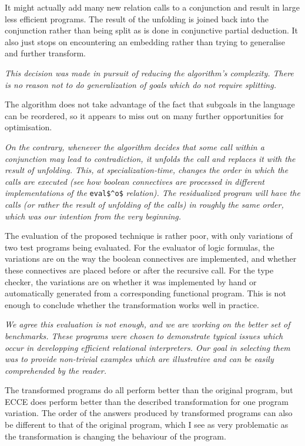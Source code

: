 It might actually add many new relation calls to a conjunction and result in large less efficient programs. The result of the unfolding is joined back into the conjunction rather than being split as is done in conjunctive partial deduction. It also just stops on encountering an embedding rather than trying to generalise and further transform.

\emph{This decision was made in pursuit of reducing the algorithm's complexity. There is no reason not to do generalization of goals which do not require splitting.}

The algorithm does not take advantage of the fact that subgoals in the language can be reordered, so it appears to miss out on many further opportunities for optimisation.

\emph{On the contrary, whenever the algorithm decides that some call within a conjunction may lead to contradiction, it unfolds the call and replaces it with the result of unfolding. This, at specialization-time, changes the order in which the calls are executed (see how boolean connectives are processed in different implementations of the} \lstinline{eval$^o$} \emph{relation). The residualized program will have the calls (or rather the result of unfolding of the calls) in roughly the same order, which was our intention from the very beginning.}

The evaluation of the proposed technique is rather poor, with only variations of two test programs being evaluated. For the evaluator of logic formulas, the variations are on the way the boolean connectives are implemented, and whether these connectives are placed before or after the recursive call. For the type checker, the variations are on whether it was implemented by hand or  automatically generated from a corresponding functional program. This is not enough to conclude whether the transformation works well in practice.

\emph{We agree this evaluation is not enough, and we are working on the better set of benchmarks. These programs were chosen to demonstrate typical issues which occur in developping efficient relational interpreters. Our goal in selecting them was to provide non-trivial examples which are illustrative and can be easily comprehended by the reader.}

The transformed programs do all perform better than the original program, but ECCE does perform better than the described transformation for one program variation. The order of the answers produced by transformed programs can also be different to that of the original program, which I see as very problematic as the transformation is changing the behaviour of the program.

